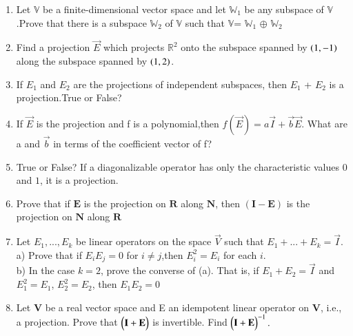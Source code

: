 \renewcommand{\theequation}{\theenumi}
\renewcommand{\thefigure}{\theenumi}
\begin{enumerate}[label=\thesubsection.\arabic*.,ref=\thesubsection.\theenumi]

\item Let $\mathbb{V}$ be a finite-dimensional vector space and let $\mathbb{W}_1$ be any subspace of $\mathbb{V}$.Prove that there is a subspace $\mathbb{W}_2$ of $\mathbb{V}$ such that $\mathbb{V}$= $\mathbb{W}_1$ $\oplus$ $\mathbb{W}_2$
%
\\
\solution

\item Find a projection $\vec{E}$ which projects $\mathbb{R}^{2}$ onto the subspace spanned by $\left(1,-1\right)$ along the subspace spanned by $\left(1,2\right)$.
%
\\
\solution

\item %
If $E_1$ and $E_2$ are the projections of independent subspaces, then $E_1$ + $E_2$ is a projection.True or False?
%
\\
\solution

\item If $\vec{E}$ is the projection and f is a polynomial,then $f(\vec{E})=a\vec{I}+\vec{b}\vec{E}$. What are a and $\vec{b}$ in terms of the coefficient vector of f?
%
\\
\solution

\item %
True or False? If a diagonalizable operator has only the characteristic values $0$ and $1$, it is a projection.
%
\\
\solution

\item 	Prove that if $\mathbf{E}$ is the projection on $\mathbf{R}$ along $\mathbf{N}$, then $(\mathbf{I-E})$ is the projection on $\mathbf{N}$ along $\mathbf{R}$ 
%
\\
\solution

\item Let $E_1,...,E_k$ be linear operators on the space $\vec{V}$ such that $E_1+...+E_k =\vec{I}$.\\
a) Prove that if $E_iE_j = 0$ for $i\neq j$,then $E_i^2=E_i$ for each $i$.\\
b) In the case $k=2$, prove the converse of (a). That is, if $E_1+E_2=\vec{I}$ and $E_1^2 = E_1$, $E_2^2= E_2$, then $E_1E_2=0$
%
\\
\solution

\item 	Let $\mathbf{V}$ be a real vector space and E an idempotent linear operator on $\mathbf{V}$, i.e., a projection. Prove that $\begin{pmatrix}\mathbf{I} + \mathbf{E}\end{pmatrix}$ is
	invertible. Find $\begin{pmatrix}\mathbf{I} + \mathbf{E}\end{pmatrix}^{-1}.$
%
\\
\solution

\end{enumerate}
